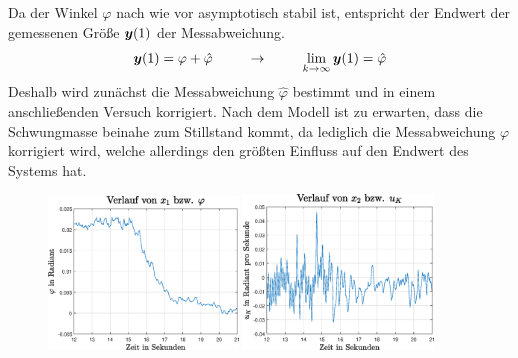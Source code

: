 Da der Winkel $\varphi$ nach wie vor asymptotisch stabil ist, entspricht der Endwert der gemessenen Größe $\boldsymbol{y}(1)$ der Messabweichung.
\begin{equation}
\boldsymbol{y}(1) = \varphi + \hat{\varphi} \hspace{25pt} \rightarrow\hspace{25pt} \lim_{k\rightarrow\infty}\boldsymbol{y}(1) = \hat{\varphi}
\end{equation}
Deshalb wird zunächst die Messabweichung $\hat{\varphi}$ bestimmt und in einem anschließenden Versuch korrigiert. Nach dem Modell ist zu erwarten, dass die Schwungmasse beinahe zum Stillstand kommt, da lediglich die Messabweichung $\varphi$ korrigiert wird, welche allerdings den größten Einfluss auf den Endwert des Systems hat.
\begin{figure}[!ht]
\centering
\includegraphics[width=0.45\textwidth]{img/edge_exp2_phi.eps}\hspace{0.7cm}
\includegraphics[width=0.45\textwidth]{img/edge_exp2_uk.eps}
\label{plot1_edge_exp2}
\end{figure}
